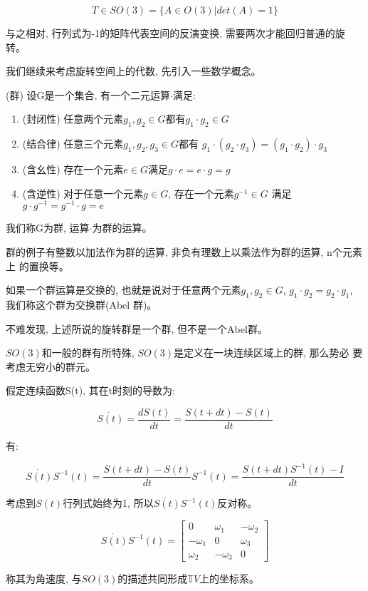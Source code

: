 \documentclass{ctexart}
\numberwithin{equation}{subsection}
\numberwithin{theorem}{subsection}
\numberwithin{definition}{subsection}
\numberwithin{proof}{subsection}
\numberwithin{lemma}{subsection}
\numberwithin{example}{subsection}
\numberwithin{remark}{subsection}
\numberwithin{corollary}{subsection}
\numberwithin{exercise}{subsection}
\numberwithin{problem}{subsection}
\numberwithin{question}{section}
\numberwithin{method}{subsection}
\begin{document}
    \begin{equation}
        T \in SO(3) = \{A \in O(3) | det(A) = 1\}
    \end{equation}

    与之相对, 行列式为-1的矩阵代表空间的反演变换, 需要两次才能回归普通的旋转。

    我们继续来考虑旋转空间上的代数, 先引入一些数学概念。

    (群) 设G是一个集合, 有一个二元运算\(\cdot\)满足:
    \begin{enumerate}
        \item (封闭性) 任意两个元素\(g_1, g_2 \in G\)都有\(g_1 \cdot g_2 \in G\)
        \item (结合律) 任意三个元素\(g_1, g_2, g_3 \in G\)都有
            \(g_1 \cdot (g_2 \cdot g_3) = (g_1 \cdot g_2) \cdot g_3\)
        \item (含幺性) 存在一个元素\(e \in G\)满足\(g \cdot e = e \cdot g = g\)
        \item (含逆性) 对于任意一个元素\(g \in G\), 存在一个元素\(g^{-1} \in G\)
            满足\(g \cdot g^{-1} = g^{-1} \cdot g = e\)
    \end{enumerate}
    我们称G为群, 运算\(\cdot\)为群的运算。

    群的例子有整数以加法作为群的运算, 非负有理数上以乘法作为群的运算, n个元素上
    的置换等。

    如果一个群运算是交换的, 也就是说对于任意两个元素\(g_1, g_2 \in G\),
    \(g_1 \cdot g_2 = g_2 \cdot g_1\), 我们称这个群为交换群(Abel 群)。

    不难发现, 上述所说的旋转群是一个群, 但不是一个Abel群。

    $SO(3)$和一般的群有所特殊, $SO(3)$是定义在一块连续区域上的群, 那么势必
    要考虑无穷小的群元。

    假定连续函数S(t), 其在t时刻的导数为:

    \begin{equation}
        \dot{S(t)} = \frac{dS(t)}{dt} = \frac{S(t + dt) - S(t)}{dt}
    \end{equation}
    
    有:

    \begin{equation}
        \dot{S(t)}S^{-1}(t) = \frac{S(t + dt) - S(t)}{dt} S^{-1}(t) = \frac{S(t + dt)S^{-1}(t) - I}{dt}
    \end{equation}

    考虑到$S(t)$行列式始终为1, 所以$\dot{S(t)}S^{-1}(t)$反对称。

    \begin{equation}
        \dot{S(t)}S^{-1}(t) = 
        \begin{bmatrix}
            0 & \omega_1 & -\omega_2 \\
            -\omega_1 & 0 & \omega_3 \\
            \omega_2 & -\omega_3 & 0
        \end{bmatrix}
    \end{equation}

    称其为角速度, 与$SO(3)$的描述共同形成$\mathbb{T}V$上的坐标系。
    \footnotemark
\end{document}

